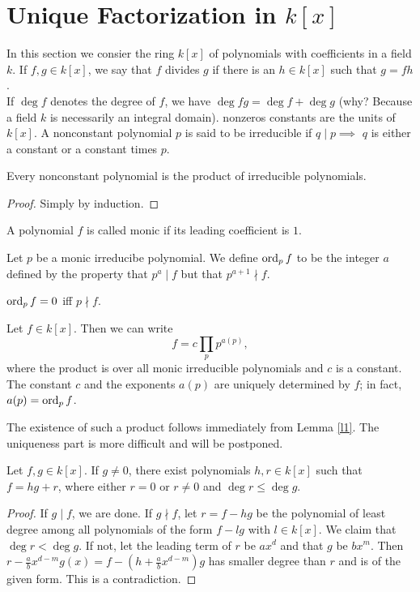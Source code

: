 \section{Unique Factorization in $k[x]$}
In this section we consier the ring $k[x]$ of polynomials with coefficients in a field $k$. If $f,g\in k[x]$, we say that $f$ divides $g$ if there is an $h\in k[x]$ such that $g= fh$.\\
If $\deg{f}$ denotes the degree of $f$, we have $\deg{fg}= \deg{f}+\deg{g}$ (why? Because a field $k$ is necessarily an integral domain). nonzeros constants are the units of $k[x]$. A nonconstant polynomial $p$ is said to be irreducible if $q\mid p\implies$ $q$ is either a constant or a constant times $p$.
\begin{lemma}\label{l1}
Every nonconstant polynomial is the product of irreducible polynomials.
\end{lemma}
\begin{proof}
Simply by induction.
\end{proof}
\begin{definition}
A polynomial $f$ is called monic if its leading coefficient is $1$.
\end{definition}
\begin{definition}
Let $p$ be a monic irreducibe polynomial. We define $\mbox{ord}_{p}\,f$ to be the integer $a$ defined by the property that $p^a\mid f$ but that $p^{a+1}\nmid f$.
\end{definition}
\begin{remark}
$\mbox{ord}_{p}\,f = 0$ iff $p\nmid f$.
\end{remark}
\begin{theorem}
Let $f\in k[x]$. Then we can write$$f= c\prod_pp^{a(p)},$$ where the product is over all monic irreducible polynomials and $c$ is a constant. The constant $c$ and the exponents $a(p)$ are uniquely determined by $f$; in fact, $a(p)= \mbox{ord}_{p}\,f$.
\end{theorem}
The existence of such a product follows immediately from Lemma \ref{l1}. The uniqueness part is more difficult and will be postponed.
\begin{lemma}
Let $f,g\in k[x]$. If $g\ne 0$, there exist polynomials $h,r\in k[x]$ such that $f=hg+r$, where either $r=0$ or $r\ne0$ and $\deg{r}\le \deg{g}$.
\end{lemma}
\begin{proof}
If $g\mid f$, we are done. If $g\nmid f$, let $r= f-hg$ be the polynomial of least degree among all polynomials of the form $f-lg$ with $l\in k[x]$. We claim that $\deg{r}<\deg{g}$. If not, let the leading term of $r$ be $ax^d$ and that $g$ be $bx^m$. Then $r-\frac{a}{b}x^{d-m}g(x)= f-(h+\frac{a}{b}x^{d-m})g$ has smaller degree than $r$ and is of the given form. This is a contradiction.
\end{proof}
